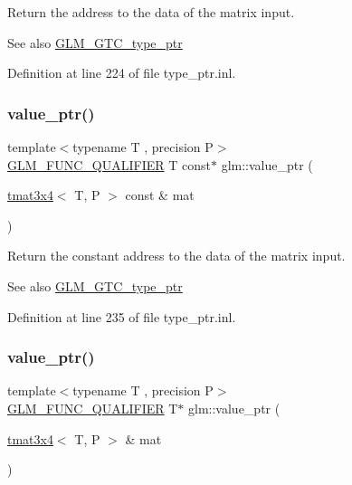 Return the address to the data of the matrix input. \begin{DoxySeeAlso}{See also}
\mbox{\hyperlink{group__gtc__type__ptr}{G\+L\+M\+\_\+\+G\+T\+C\+\_\+type\+\_\+ptr}} 
\end{DoxySeeAlso}


Definition at line 224 of file type\+\_\+ptr.\+inl.

\mbox{\label{group__gtc__type__ptr_gacbf08ea2313cad8a42652d4455e69709}} 
\subsubsection{\texorpdfstring{value\_ptr()}{value\_ptr()}\hspace{0.1cm}{\footnotesize\ttfamily [22/27]}}
{\footnotesize\ttfamily template$<$typename T , precision P$>$ \\
\mbox{\hyperlink{setup_8hpp_a33fdea6f91c5f834105f7415e2a64407}{G\+L\+M\+\_\+\+F\+U\+N\+C\+\_\+\+Q\+U\+A\+L\+I\+F\+I\+ER}} T const$\ast$ glm\+::value\+\_\+ptr (\begin{DoxyParamCaption}\item[{\mbox{\hyperlink{structglm_1_1tmat3x4}{tmat3x4}}$<$ T, P $>$ const \&}]{mat }\end{DoxyParamCaption})}

Return the constant address to the data of the matrix input. \begin{DoxySeeAlso}{See also}
\mbox{\hyperlink{group__gtc__type__ptr}{G\+L\+M\+\_\+\+G\+T\+C\+\_\+type\+\_\+ptr}} 
\end{DoxySeeAlso}


Definition at line 235 of file type\+\_\+ptr.\+inl.

\mbox{\label{group__gtc__type__ptr_gafac7c10d557c3db2f061af0ffe8fc9cf}} 
\subsubsection{\texorpdfstring{value\_ptr()}{value\_ptr()}\hspace{0.1cm}{\footnotesize\ttfamily [23/27]}}
{\footnotesize\ttfamily template$<$typename T , precision P$>$ \\
\mbox{\hyperlink{setup_8hpp_a33fdea6f91c5f834105f7415e2a64407}{G\+L\+M\+\_\+\+F\+U\+N\+C\+\_\+\+Q\+U\+A\+L\+I\+F\+I\+ER}} T$\ast$ glm\+::value\+\_\+ptr (\begin{DoxyParamCaption}\item[{\mbox{\hyperlink{structglm_1_1tmat3x4}{tmat3x4}}$<$ T, P $>$ \&}]{mat }\end{DoxyParamCaption})}

